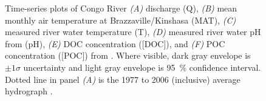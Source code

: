 \begin{figure}[p]
	\caption[Environmental parameter time-series plots]{Time-series plots of Congo River \textit{(A)} discharge (Q), \textit{(B)} mean monthly air temperature at Brazzaville/Kinshasa (MAT), \textit{(C)} measured river water temperature (T), \textit{(D)} measured river water pH from \citet{Wang:2013js} (pH), \textit{(E)} DOC concentration ([DOC]), and \textit{(F)} POC concentration ([POC]) from \citet{Hemingway:2016bq}. Where visible, dark gray envelope is $\pm 1 \sigma$ uncertainty and light gray envelope is \SI{95}{\%} confidence interval. Dotted line in panel \textit{(A)} is the 1977 to 2006 (inclusive) average hydrograph \citep{Spencer:2012en}.}
	\label{Ch5Fig:2} 
\end{figure}

